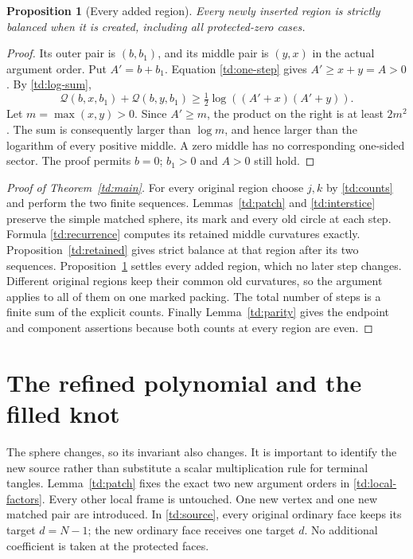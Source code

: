 \documentclass[11pt]{article}
\numberwithin{equation}{section}
\newtheorem{proposition}[theorem]{Proposition}
\theoremstyle{definition}
\newcommand{\calQ}{\mathcal Q}
\begin{document}
\begin{proposition}[Every added region]\label{td:added}
Every newly inserted region is strictly balanced when it is
created, including all protected-zero cases.
\end{proposition}

\begin{proof}
Its outer pair is \((b,b_1)\), and its middle pair is \((y,x)\)
in the actual argument order. Put \(A'=b+b_1\). Equation
\eqref{td:one-step} gives \(A'\ge x+y=A>0\).
By \eqref{td:log-sum},
\[
 \calQ(b,x,b_1)+\calQ(b,y,b_1)
       \ge\tfrac12\log((A'+x)(A'+y)).
\]
Let \(m=\max(x,y)>0\). Since \(A'\ge m\), the product on the
right is at least \(2m^2\). The sum is consequently larger
than \(\log m\), and hence larger than the logarithm of every
positive middle. A zero middle has no corresponding one-sided
sector. The proof permits \(b=0\); \(b_1>0\) and \(A>0\)
still hold.
\end{proof}

\begin{proof}[Proof of Theorem~\ref{td:main}]
For every original region choose \(j,k\) by \eqref{td:counts}
and perform the two finite sequences. Lemmas~\ref{td:patch}
and \ref{td:interstice} preserve the simple matched sphere,
its mark and every old circle at each step. Formula
\eqref{td:recurrence} computes its retained middle curvatures
exactly. Proposition~\ref{td:retained} gives strict balance
at that region after its two sequences. Proposition~\ref{td:added}
settles every added region, which no later step changes.
Different original regions keep their common old curvatures,
so the argument applies to all of them on one marked packing.
The total number of steps is a finite sum of the explicit counts.
Finally Lemma~\ref{td:parity} gives the endpoint and component
assertions because both counts at every region are even.
\end{proof}

\section{The refined polynomial and the filled knot}

The sphere changes, so its invariant also changes. It is important
to identify the new source rather than substitute a scalar
multiplication rule for terminal tangles. Lemma~\ref{td:patch}
fixes the exact two new argument orders in
\eqref{td:local-factors}. Every other local frame is untouched.
One new vertex and one new matched pair are introduced. In
\eqref{td:source}, every original ordinary face keeps its target
\(d=N-1\); the new ordinary face receives one target \(d\).
No additional coefficient is taken at the protected faces.
\end{document}
